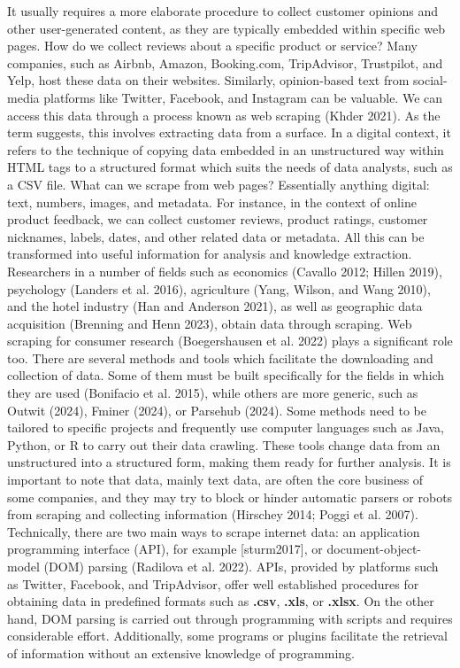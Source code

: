 It usually requires a more elaborate procedure to collect customer opinions and other user-generated content, as they are typically embedded
within specific web pages. How do we collect reviews about a
specific product or service? Many companies, such as Airbnb, Amazon, Booking.com, TripAdvisor, Trustpilot,
and Yelp, host these data on their websites. Similarly, opinion-based text from social-media platforms like
Twitter, Facebook, and Instagram can be valuable. We can access this
data through a process known as web scraping (Khder 2021). As
the term suggests, this involves extracting data from a surface. In a
digital context, it refers to the technique of copying data embedded in
an unstructured way within HTML tags to a structured format which suits the needs of data analysts, such as a
CSV file. What can we scrape
from web pages? Essentially anything digital: text, numbers, images, and
metadata. For instance, in the context of online product feedback, we
can collect customer reviews, product ratings, customer nicknames,
labels, dates, and other related data or metadata. All this can be
transformed into useful information for analysis and knowledge
extraction. Researchers in a number of fields such as economics
(Cavallo 2012; Hillen 2019), psychology (Landers et al. 2016),
agriculture (Yang, Wilson, and Wang 2010), and the hotel industry (Han and Anderson 2021), as well as geographic data acquisition (Brenning
and Henn 2023), obtain data through scraping. Web scraping for consumer
research (Boegershausen et al. 2022) plays a significant role too. There
are several methods and tools which facilitate the downloading and collection of data. Some of them must be built specifically for
the fields in which they are used (Bonifacio et al. 2015), while others
are more generic, such as Outwit (2024), Fminer
(2024), or Parsehub (2024). Some methods need to be tailored to specific projects and
frequently use computer languages such as Java, Python, or R to carry out their
data crawling. These tools change data from an unstructured into
a structured form, making them ready for further analysis. It is important to
note that data, mainly text data, are often the core business of some
companies, and they may try to block or hinder automatic parsers or
robots from scraping and collecting information (Hirschey 2014; Poggi et
al. 2007). Technically, there are two main ways to scrape internet data:
an application programming interface (API), for example {[}sturm2017{]},
or document-object-model (DOM) parsing (Radilova et al. 2022). APIs,
provided by platforms such as Twitter, Facebook, and TripAdvisor, offer
well established procedures for obtaining data in predefined formats such as
\textbf{.csv}, \textbf{.xls}, or \textbf{.xlsx}. On the other hand, DOM
parsing is carried out through programming with scripts and requires
considerable effort. Additionally, some programs or plugins facilitate
the retrieval of information without an extensive knowledge of programming.

